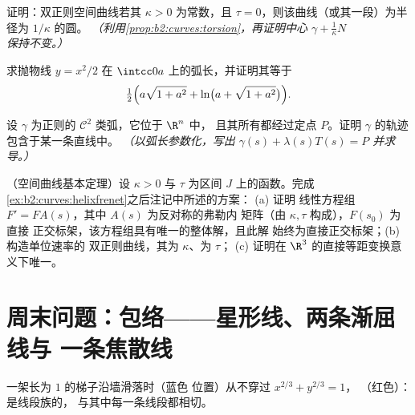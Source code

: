 \begin{exercise}[$\star\star\star$]\label{exo:b2:curves:9}
证明：双正则空间曲线若其 $\kappa > 0$ 为常数，且
$\tau = 0$，则该曲线（或其一段）为半径为 $1/\kappa$ 的圆。
\emph{（利用\cref{prop:b2:curves:torsion}，再证明中心
$\gamma + \frac1\kappa N$ 保持不变。）}
\end{exercise}

\begin{exercise}[$\star$]\label{exo:b2:curves:10}
求抛物线 $y = x^2/2$ 在
$\intcc0a$ 上的弧长，并证明其等于
\[
\tfrac12\Bigl(a\sqrt{1 + a^2} + \ln\bigl(a + \sqrt{1 +
a^2}\bigr)\Bigr).
\]
\end{exercise}

\begin{exercise}[$\star\star$]\label{exo:b2:curves:11}
设 $\gamma$ 为正则的 $\mathcal C^2$ 类弧，它位于 $\R^n$ 中，
且其所有都经过定点 $P$。证明
$\gamma$ 的轨迹包含于某一条直线中。
\emph{（以弧长参数化，写出 $\gamma(s) +
\lambda(s)T(s) = P$ 并求导。）}
\end{exercise}

\begin{exercise}[$\star\star\star$]\label{exo:b2:curves:12}
（空间曲线基本定理）设 $\kappa > 0$ 与
$\tau$ 为区间 $J$ 上的函数。完成
\cref{ex:b2:curves:helixfrenet}之后注记中所述的方案：
(a) 证明
线性方程组 $F' = FA(s)$，其中 $A(s)$ 为反对称的弗勒内
矩阵（由 $\kappa, \tau$ 构成），$F(s_0)$ 为直接
正交标架，该方程组具有唯一的整体解，且此解
始终为直接正交标架；(b) 构造单位速率的
双正则曲线，其为 $\kappa$、为 $\tau$；
(c) 证明在 $\R^3$ 的直接等距变换意义下唯一。
\end{exercise}

\section{周末问题：包络——星形线、两条渐屈线与
一条焦散线}

\begin{omfigure}

{\small 一架长为 $1$ 的梯子沿墙滑落时（蓝色
位置）从不穿过 $x^{2/3} + y^{2/3} = 1$，
（红色）：是线段族的\emph{}，
与其中每一条线段都相切。}
\end{omfigure}

